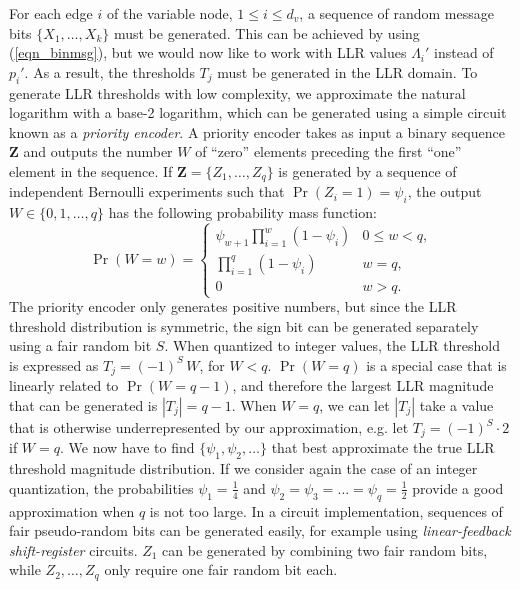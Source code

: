 \documentclass[12pt,journal,twoside,draftcls,onecolumn]{IEEEtran}
\newcommand{\bvec}[1]{\mathbf{#1}}
\begin{document}
	For each edge $i$ of the variable node, $1 \leq i \leq d_v$, a sequence of random message bits $\{X_1, \ldots, X_k\}$ must be generated. This can be achieved by using (\ref{eqn_binmsg}), but we would now like to work with LLR values $\Lambda_{i}'$ instead of $p_{i}'$. As a result, the thresholds $T_j$ must be generated in the LLR domain.
	To generate LLR thresholds with low complexity, we approximate the natural logarithm with a base-2 logarithm, which can be generated using a simple circuit known as a \emph{priority encoder}. A priority encoder takes as input a binary sequence $\bvec{Z}$ and outputs the number $W$ of ``zero'' elements preceding the first ``one'' element in the sequence. If $\bvec{Z} = \{Z_1, \ldots, Z_q\}$ is generated by a sequence of independent Bernoulli experiments such that $\Pr(Z_i=1)=\psi_i$, the output $W \in \{0,1,\ldots,q\}$ has the following probability mass function:
	\begin{equation}
	\label{eqn_priorityPMF}
	\Pr(W=w) =
		\begin{cases}
		\psi_{w+1} \prod_{i=1}^{w} \left(1-\psi_i \right) & \text{$0 \leq w < q$,} \\
		\prod_{i=1}^{q} \left(1-\psi_i \right) & \text{$w=q$,} \\
		0 & \text{$w > q$.}
		\end{cases}
	\end{equation}
	The priority encoder only generates positive numbers, but since the LLR threshold distribution is symmetric, the sign bit can be generated separately using a fair random bit $S$.
	When quantized to integer values, the LLR threshold is expressed as $T_j = (-1)^S \, W$, for $W < q$. $\Pr(W=q)$ is a special case that is linearly related to $\Pr(W=q-1)$, and therefore the largest LLR magnitude that can be generated is $|T_j| = q-1$. When $W=q$, we can let $|T_j|$ take a value that is otherwise underrepresented by our approximation, e.g. let $T_j = (-1)^S \cdot 2$ if $W=q$.
	We now have to find $\{\psi_1, \psi_2, \ldots\}$ that best approximate the true LLR threshold magnitude distribution. If we consider again the case of an integer quantization, the probabilities $\psi_1=\frac{1}{4}$ and $\psi_2=\psi_3=\ldots=\psi_q=\frac{1}{2}$ provide a good approximation when $q$ is not too large. 
	In a circuit implementation, sequences of fair pseudo-random bits can be generated easily, for example using \emph{linear-feedback shift-register} circuits. $Z_1$ can be generated by combining two fair random bits, while $Z_2, \ldots, Z_q$ only require one fair random bit each.
		
\end{document}
